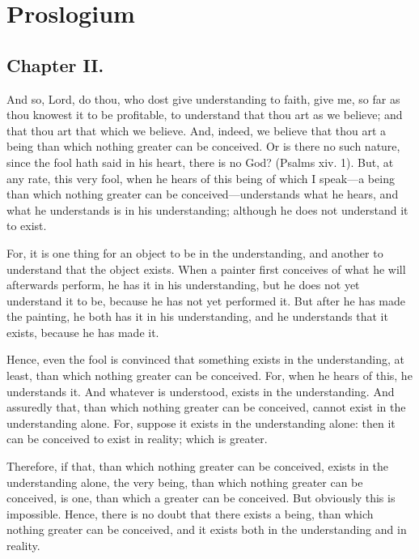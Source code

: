 
\author{Anselm of Canterbury}
\chapter[Proslogium, chaps. 2--4]{Proslogium}

\section{Chapter II.}

\begin{abstract}{h} Truly there is a God, although the fool hath said
in his heart, There is no God. \end{abstract}

\noindent And so, Lord, do thou, who dost give understanding to faith,
give me, so far as thou knowest it to be profitable, to understand
that thou art as we believe; and that thou art that which we believe.
And, indeed, we believe that thou art a being than which nothing
greater can be conceived. Or is there no such nature, since the fool
hath said in his heart, there is no God? (Psalms xiv. 1). But, at any
rate, this very fool, when he hears of this being of which I speak---a
being than which nothing greater can be con\-ceived---understands what
he hears, and what he understands is in his understanding; although he
does not understand it to exist.

For, it is one thing for an object to be in the understanding, and
another to understand that the object exists. When a painter first
conceives of what he will afterwards perform, he has it in his
understanding, but he does not yet understand it to be, because he has
not yet performed it. But after he has made the painting, he both has
it in his understanding, and he understands that it exists, because he
has made it.

Hence, even the fool is convinced that something exists in the
understanding, at least, than which nothing greater can be conceived.
For, when he hears of this, he understands it. And whatever is
understood, exists in the understanding. And assuredly that, than
which nothing greater can be conceived, cannot exist in the
understanding alone. For, suppose it exists in the understanding
alone: then it can be conceived to exist in reality; which is greater.

Therefore, if that, than which nothing greater can be conceived,
exists in the understanding alone, the very being, than which nothing
greater can be conceived, is one, than which a greater can be
conceived. But obviously this is impossible. Hence, there is no doubt
that there exists a being, than which nothing greater can be
conceived, and it exists both in the understanding and in reality.

